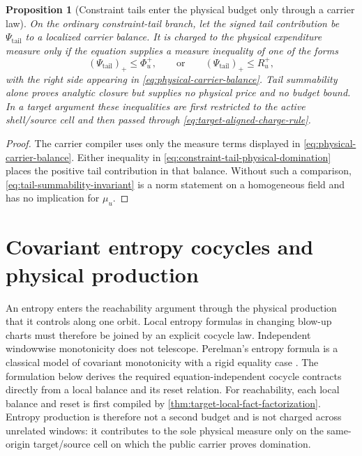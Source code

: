 \documentclass[11pt]{article}
\numberwithin{section}{part}
\theoremstyle{plain}
\newtheorem{proposition}[proposition]{Proposition}
\theoremstyle{definition}
\theoremstyle{remark}
\begin{document}
\begin{proposition}[Constraint tails enter the physical budget only through a
carrier law]
\label{prop:constraint-tail-carrier-law}
On the ordinary constraint-tail branch, let the signed tail contribution be
\(\Psi_{\mathrm{tail}}\) to a localized carrier balance.  It is charged to
the physical expenditure measure only if the equation supplies a measure
inequality of one of the forms
\begin{equation}
 \label{eq:constraint-tail-physical-domination}
 (\Psi_{\mathrm{tail}})_+\le\Phi_u^+,
 \qquad\text{or}\qquad
 (\Psi_{\mathrm{tail}})_+\le R_u^+,
\end{equation}
with the right side appearing in
\eqref{eq:physical-carrier-balance}.  Tail summability alone proves analytic
closure but supplies no physical price and no budget bound.  In a target
argument these inequalities are first restricted to the active shell/source
cell and then passed through \eqref{eq:target-aligned-charge-rule}.
\end{proposition}

\begin{proof}
The carrier compiler uses only the measure terms displayed in
\eqref{eq:physical-carrier-balance}.  Either inequality in
\eqref{eq:constraint-tail-physical-domination} places the positive tail
contribution in that balance.  Without such a comparison,
\eqref{eq:tail-summability-invariant} is a norm statement on a homogeneous
field and has no implication for \(\mu_u\).
\end{proof}

\section{Covariant entropy cocycles and physical production}
\label{sec:entropy-cocycles}

An entropy enters the reachability argument through the physical production
that it controls along one orbit.  Local entropy formulas in changing
blow-up charts
must therefore be joined by an explicit cocycle law.  Independent
windowwise monotonicity does not telescope.  Perelman's entropy formula is a
classical model of covariant monotonicity with a rigid equality case
\citep{Perelman2002}.  The formulation below derives the required
equation-independent cocycle contracts directly from a local balance and its
reset relation.
For reachability, each local balance and reset is first compiled by
\cref{thm:target-local-fact-factorization}.  Entropy production is therefore
not a second budget and is not charged across unrelated windows: it
contributes to the sole physical measure only on the same-origin
target/source cell on which the public carrier proves domination.
\end{document}
